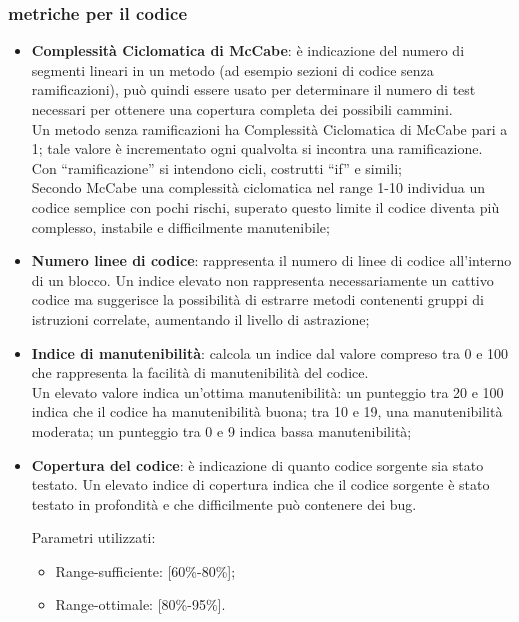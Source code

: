 {\subsubsection{metriche per il codice}{
	\begin{itemize}
		\item \textbf{Complessità Ciclomatica di McCabe}: è indicazione del numero di segmenti lineari in un metodo (ad esempio sezioni di codice senza ramificazioni), può quindi essere usato per determinare il numero di test necessari per ottenere una copertura completa dei possibili cammini.  \\
		Un metodo senza ramificazioni ha Complessità Ciclomatica di McCabe pari a 1; tale valore è incrementato ogni qualvolta si incontra una ramificazione.  \\
		Con “ramificazione” si intendono cicli, costrutti “if” e simili;\\
		Secondo McCabe una complessità ciclomatica nel range 1-10 individua un codice semplice con pochi rischi, superato questo limite il codice diventa più complesso, instabile e difficilmente manutenibile;
		
		\item \textbf{Numero linee di codice}: rappresenta il numero di linee di codice all'interno di un blocco. 
		Un indice elevato non rappresenta necessariamente un cattivo codice ma suggerisce la possibilità di estrarre metodi contenenti gruppi di istruzioni correlate, aumentando il livello di astrazione;
		
		\item \textbf{Indice di manutenibilità}: calcola un indice dal valore compreso tra 0 e 100 che rappresenta la facilità di manutenibilità del codice.  \\
		Un elevato valore indica un'ottima manutenibilità: un punteggio tra 20 e 100 indica che il codice ha manutenibilità buona; tra 10 e 19, una manutenibilità moderata; un punteggio tra 0 e 9 indica bassa manutenibilità;
		
		\item \textbf{Copertura del codice}: è indicazione di quanto codice sorgente sia stato testato. Un elevato indice di copertura indica che il codice sorgente è stato testato in profondità e che difficilmente può contenere dei bug.
		
		Parametri utilizzati:
		\begin{itemize}
		\item Range-sufficiente: [60\%-80\%];
		\item Range-ottimale: [80\%-95\%].
		\end{itemize}
	\end{itemize}
	}
}
